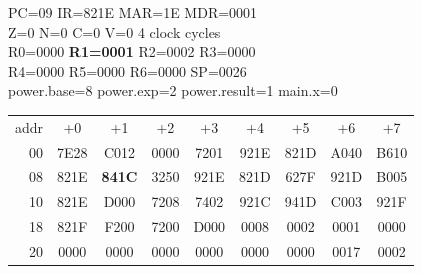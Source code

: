 \begin{tcolorbox}[stepbox, title={Step 13 \hfill PC 08 \quad LD R1, power.result}]
PC=09 IR=821E MAR=1E MDR=0001\\
Z=0 N=0 C=0 V=0 \hfill \textcolor{dim}{4 clock cycles}\\
R0=0000 \textcolor{wrt}{\textbf{R1=0001}} R2=0002 R3=0000\\
R4=0000 R5=0000 R6=0000 SP=0026\\
\textcolor{dim}{power.base=8  power.exp=2  power.result=1  main.x=0}\\[1pt]
{\setlength{\tabcolsep}{1.6pt}\begin{tabular}{@{}r*{8}{c}@{}}
\textcolor{dim}{addr} & \textcolor{dim}{+0} & \textcolor{dim}{+1} & \textcolor{dim}{+2} & \textcolor{dim}{+3} & \textcolor{dim}{+4} & \textcolor{dim}{+5} & \textcolor{dim}{+6} & \textcolor{dim}{+7}\\
\textcolor{dim}{00} & 7E28 & C012 & 0000 & 7201 & 921E & 821D & A040 & B610\\
\textcolor{dim}{08} & 821E & \cellcolor{pcc}\textbf{841C} & 3250 & 921E & 821D & 627F & 921D & B005\\
\textcolor{dim}{10} & 821E & D000 & 7208 & 7402 & 921C & 941D & C003 & 921F\\
\textcolor{dim}{18} & 821F & F200 & 7200 & D000 & \cellcolor{datac}0008 & \cellcolor{datac}0002 & \cellcolor{datac}0001 & \cellcolor{datac}0000\\
\textcolor{dim}{20} & \cellcolor{stackc}0000 & \cellcolor{stackc}0000 & \cellcolor{stackc}0000 & \cellcolor{stackc}0000 & \cellcolor{stackc}0000 & \cellcolor{stackc}0000 & \cellcolor{stackc}0017 & \cellcolor{stackc}0002\\
\end{tabular}}
\end{tcolorbox}\par\vspace{3pt}
